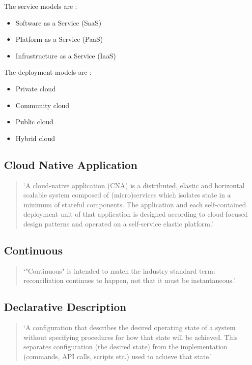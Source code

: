 The service models are
\autocite{cloudComputingNistDefinition2011}:

\begin{itemize}
	\item Software as a Service (SaaS)
	\item Platform as a Service (PaaS)
	\item Infrastructure as a Service (IaaS)
\end{itemize}

The deployment models are
\autocite{cloudComputingNistDefinition2011}:

\begin{itemize}
	\item Private cloud
	\item Community cloud
	\item Public cloud
	\item Hybrid cloud
\end{itemize}

\subsection*{Cloud Native Application}

\begin{quotation}
\noindent
\enquote*{A cloud-native application (CNA) is a distributed, elastic and horizontal scalable system composed of (micro)services which isolates state in a
minimum of stateful components. The application and each self-contained
deployment unit of that application is designed according to cloud-focused
design patterns and operated on a self-service elastic platform.}
\autocite{cloudNativeApplicationDefinition2017}
\end{quotation}

\subsection*{Continuous}
\begin{quotation}
\noindent
\enquote*{"Continuous" is intended to match the industry standard term: reconciliation continues to happen, not that it must be instantaneous.}
\autocite{gitopsGlossary}
\end{quotation}

\subsection*{Declarative Description}
\begin{quotation}
\noindent
\enquote*{A configuration that describes the desired operating state of a system without specifying procedures for how that state will be achieved. This separates configuration (the desired state) from the implementation (commands, API calls, scripts etc.) used to achieve that state.}
\autocite{gitopsGlossary}
\end{quotation}

